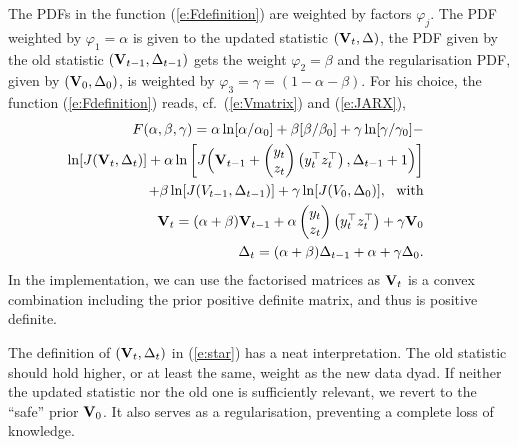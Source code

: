 The PDFs in the function (\ref{e:Fdefinition}) are weighted by factors $\varphi_{j}$. The PDF
weighted by $\varphi_1 = \alpha$ is given to the updated statistic $(\mathbf{V}_{t},\Delta)$, the PDF given by  the old statistic $(\mathbf{V}_{t-1},\Delta_{t-1})$ gets the weight $\varphi_2 = \beta$ and the regularisation PDF, given by $(\mathbf{V}_{0},\Delta_{0})$, is weighted by $\varphi_3 = \gamma=(1-\alpha-\beta)$. For his choice, the function (\ref{e:Fdefinition}) reads, cf.\  (\ref{e:Vmatrix}) and (\ref{e:JARX}),
\begin{eqnarray}
\nonumber
&&\hspace*{-4ex}F(\alpha,\beta,\gamma)=\alpha\ln[\alpha/\alpha_{0}]+\beta[\beta/\beta_{0}] + \gamma\ln[\gamma/\gamma_{0}]-\\
\nonumber %
&&\hspace*{-7ex}\ln[J(\mat{V}_{t},\Delta_{t})]+\alpha\ln\bigg[J\Big(\mat{V}_{t-1}
+\begin{pmatrix}
        y_{t}\\ z_{t}
    \end{pmatrix}
    \begin{pmatrix}
        y_{t}^{\top} z_{t}^{\top}
    \end{pmatrix}
,\Delta_{t-1}+1\Big)\bigg]\\
\nonumber
&&\hspace*{-4ex}+\beta \ln[J(V_{t-1},\Delta_{t-1})]+\gamma\ln[J(V_{0},\Delta_{0})],\ \mbox{ with}\\
\label{e:star}
&&\hspace*{-4ex}\mat{V}_{t}=(\alpha+\beta)\mat{V}_{t-1}+\alpha\begin{pmatrix}
        y_{t}\\ z_{t}
    \end{pmatrix}
    \begin{pmatrix}
        y_{t}^{\top} z_{t}^{\top}
    \end{pmatrix}   +\gamma \mat{V}_{0}\\
\nonumber
&&\hspace*{-8ex}\Delta_{t}=(\alpha+\beta)\Delta_{t-1}+\alpha+\gamma\Delta_{0}.
\end{eqnarray}
In the implementation, we can use the factorised matrices as $\mathbf{V}_{t}$ is a convex combination including the prior positive definite matrix, and thus is positive definite.

 The definition of $(\mathbf{V}_{t},\Delta_{t})$ in (\ref{e:star}) has a neat interpretation. The old statistic should hold higher, or at least the same, weight as the new data dyad. If neither the updated statistic nor the old one is sufficiently relevant, we revert to the ``safe'' prior $\mathbf{V}_{0}$. It also serves as a regularisation, preventing a complete loss of knowledge.

